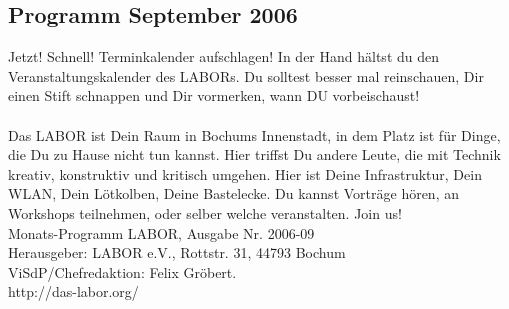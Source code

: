 \documentclass[10pt,landscape,a4paper]{article}
\begin{document}
\begin{multicols}{3}

\section{Programm September 2006} %
Jetzt! Schnell! Terminkalender aufschlagen! In der Hand h\"altst du den
Veranstaltungskalender des LABORs. Du solltest besser mal reinschauen,
Dir einen Stift schnappen und Dir vormerken, wann DU vorbeischaust! \\
\\
Das LABOR ist Dein Raum in Bochums Innenstadt, in dem Platz ist f\"ur
Dinge, die Du zu Hause nicht tun kannst. Hier triffst Du andere Leute,
die mit Technik kreativ, konstruktiv und kritisch umgehen. Hier ist
Deine Infrastruktur, Dein WLAN, Dein L\"otkolben, Deine Bastelecke. Du
kannst Vortr\"age h\"oren, an Workshops teilnehmen, oder selber welche
veranstalten. Join us! \\


Monats-Programm LABOR, Ausgabe Nr. 2006-09 \\ %
Herausgeber: LABOR e.V., Rottstr. 31, 44793 Bochum \\
ViSdP/Chefredaktion: Felix Gr\"obert.\\
http://das-labor.org/



\end{multicols}
\end{document}

